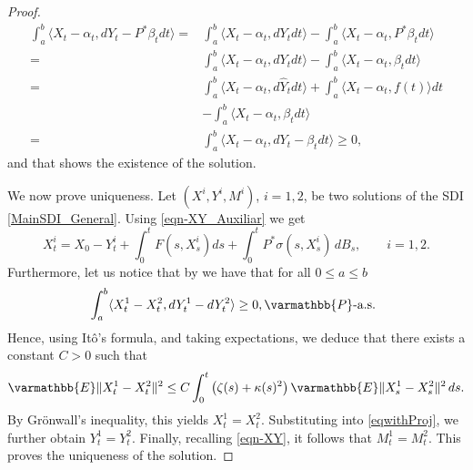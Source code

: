 \documentclass[11pt,reqno]{article}
\let\mathbb=\varmathbb
\newcommand{\1}{\mathds{1}}
\numberwithin{equation}{section}  %
\theoremstyle{plain}
\theoremstyle{definition}
\theoremstyle{remark}
\numberwithin{theorem}{section}
\numberwithin{remark}{section}
\numberwithin{example}{section}
\begin{document}
\begin{proof}
\begin{align*}
\int_{a}^b \langle X_t - \alpha_t , dY_t - P^\ast \beta_t dt\rangle   = & \int_{a}^b \langle X_t - \alpha_t , dY_t dt\rangle  - \int_{a}^b \langle X_t - \alpha_t , P^\ast \beta_t dt\rangle  \\=  &\int_{a}^b \langle X_t - \alpha_t , dY_t dt\rangle  - \int_{a}^b \langle X_t - \alpha_t , \beta_t dt\rangle   \\ =& \int_{a}^b \langle X_t - \alpha_t , d\hat{Y}_t dt\rangle    + \int_{a}^b \langle X_t - \alpha_t , f(t)\rangle dt \\ &  - \int_{a}^b \langle X_t - \alpha_t , \beta_t dt\rangle \\
 =&\int_{a}^b \langle X_t - \alpha_t , dY_t - \beta_t dt\rangle \geq 0,
\end{align*}  
and that shows the existence of the solution. 

 

We now prove uniqueness.  
Let $(X^i,Y^i,M^i)$, $i=1,2$, be two solutions of the SDI \eqref{MainSDI_General}.  
Using \eqref{eqn-XY_Auxiliar}  we get
\begin{equation}\label{eqwithProj}
    X^i_t = X_0 - Y^i_t + \int_0^t F(s,X_s^i) ds +  \int_0^t P^\ast \sigma(s,X^i_s)\,dB_s, 
    \qquad i=1,2. 
\end{equation} 
Furthermore, let us notice that by \cite[Proposition 6.17]{MR3308895}  we have that for all $0\leq a \leq b$
\begin{align*}
    \int_a^b \langle X_t^1 - X_t^2 , dY_t^1 - dY_t^2 \rangle \geq 0, \mathbb{P}\text{-a.s. } 
\end{align*}
Hence, using Itô’s formula, and taking expectations, we deduce that there exists a constant $C>0$ such that 
\[
      \mathbb{E}\|X^1_t - X^2_t\|^2 
      \leq C \int_0^t \left( \zeta(s) +  \kappa(s)^2 \right) \mathbb{E}\|X^1_s - X^2_s\|^2 \, ds.
\]
By Grönwall's inequality, this yields $X^1_t = X^2_t$.  
Substituting into \eqref{eqwithProj}, we further obtain $Y^1_t = Y^2_t$.  
Finally, recalling \eqref{eqn-XY},  it follows that $M^1_t = M^2_t$.
This proves the uniqueness of the solution.
\end{proof}
\end{document}
